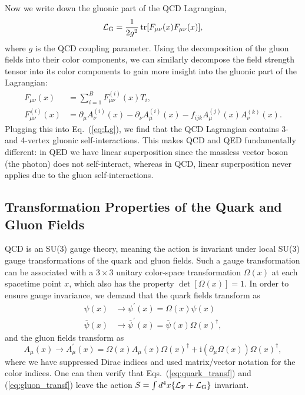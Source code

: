 Now we write down the gluonic part of the QCD Lagrangian,
\begin{equation}\label{eq:Lg}
    \mathcal L_{\rm G} = \frac{1}{2g^2} \tr[F_{\mu\nu}(x) F_{\mu\nu}(x)],
\end{equation}
where $g$ is the QCD coupling parameter. Using the decomposition of the gluon fields into their color components, we can similarly decompose the field strength tensor into its color components to gain more insight into the gluonic part of the Lagrangian:
\begin{equation}
    \begin{aligned}
        F_{\mu \nu}(x) &=\sum_{i=1}^{B} F_{\mu \nu}^{(i)}(x) T_{i}, \\
        F_{\mu \nu}^{(i)}(x) &=\partial_{\mu} A_{\nu}^{(i)}(x)-\partial_{\nu} A_{\mu}^{(i)}(x)-f_{i j k} A_{\mu}^{(j)}(x) A_{\nu}^{(k)}(x).
        \end{aligned}
\end{equation}
Plugging this into Eq.~(\ref{eq:Lg}), we find that the QCD Lagrangian contains 3- and 4-vertex gluonic self-interactions. This makes QCD and QED fundamentally different: in QED we have linear superposition since the massless vector boson (the photon) does not self-interact, whereas in QCD, linear superposition never applies due to the gluon self-interactions.
\subsection{Transformation Properties of the Quark and Gluon Fields}
QCD is an SU(3) gauge theory, meaning the action is invariant under local SU(3) gauge transformations of the quark and gluon fields. Such a gauge transformation can be associated with a $3\times3$ unitary color-space transformation $\Omega(x)$ at each spacetime point $x$, which also has the property $\det[\Omega(x)] = 1$. In order to ensure gauge invariance, we demand that the quark fields transform as
\begin{equation}\label{eq:quark_transf}
    \begin{aligned}
    \psi(x) &\rightarrow \psi^{\prime}(x)=\Omega(x) \psi(x)\\
    \overline{\psi}(x) &\rightarrow \overline{\psi}^{\prime}(x)=\overline{\psi}(x) \Omega(x)^{\dagger},
    \end{aligned}
\end{equation}
and the gluon fields transform as
\begin{equation}\label{eq:gluon_transf}
    A_{\mu}(x) \rightarrow A_{\mu}^{\prime}(x)=\Omega(x) A_{\mu}(x) \Omega(x)^{\dagger}+\mathrm{i}\left(\partial_{\mu} \Omega(x)\right) \Omega(x)^{\dagger},
\end{equation}
where we have suppressed Dirac indices and used matrix/vector notation for the color indices. One can then verify that Eqs.~(\ref{eq:quark_transf}) and (\ref{eq:gluon_transf}) leave the action $S=\int d^4 x \lbrace \mathcal L_{\rm{F}} + \mathcal L_{\rm{G}}\rbrace$ invariant.
